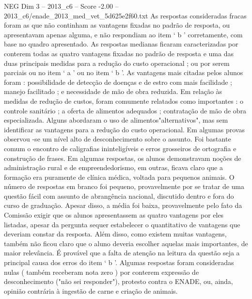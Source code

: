 \begin{textsample}{NEG Dim 3 – 2013\_c6 – Score -2.00 – 2013\_c6/enade\_2013\_med\_vet\_5d625e2f60.txt}
As respostas consideradas fracas foram as que não continham as vantagens fixadas no padrão de resposta, ou apresentavam apenas alguma, e não respondiam ao item ‘ b ’ corretamente, com base no quadro apresentado.
As respostas medianas ficaram caracterizadas por conterem todas as quatro vantagens fixadas no padrão de resposta e uma das duas principais medidas para a redução do custo operacional ; ou por serem parciais ou no item ‘ a ’ ou no item ‘ b ’.
As vantagens mais citadas pelos alunos foram : possibilidade de detecção de doenças e de estro com mais facilidade ; manejo facilitado ; e necessidade de mão de obra reduzida.
Em relação às medidas de redução de custos, foram comumente relatados como importantes : o controle sanitário ; a oferta de alimentos adequados ; contratação de mão de obra especializada.
Alguns abordaram o uso de alimentos"alternativos", mas sem identificar as vantagens para a redução do custo operacional.
Em algumas provas observou -se um nível alto de desconhecimento sobre o assunto.
Foi bastante comum o encontro de caligrafias ininteligíveis e erros grosseiros de ortografia e construção de frases.
Em algumas respostas, os alunos demonstravam noções de administração rural e de empreendedorismo, em outras, ficava claro que a formação era puramente de clínica médica, voltada para pequenos animais.
O número de respostas em branco foi pequeno, provavelmente por se tratar de uma questão fácil com assunto de abrangência nacional, discutido dentro e fora do curso de graduação.
Apesar disso, a média foi baixa, provavelmente pelo fato da Comissão exigir que os alunos apresentassem as quatro vantagens por eles listadas, apesar da pergunta sequer estabelecer o quantitativo de vantagens que deveriam constar da resposta.
Além disso, como existem muitas vantagens, também não ficou claro que o aluno deveria escolher aquelas mais importantes, de maior relevância.
É provável que a falta de atenção na leitura da questão seja a principal causa dos erros do item ‘ b ’.
Algumas respostas foram consideradas nulas ( também receberam nota zero ) por conterem expressão de desconhecimento ("não sei responder"), protesto contra o ENADE, ou, ainda, opinião contrária à ingestão de carne e criação de animais.

\end{textsample}
